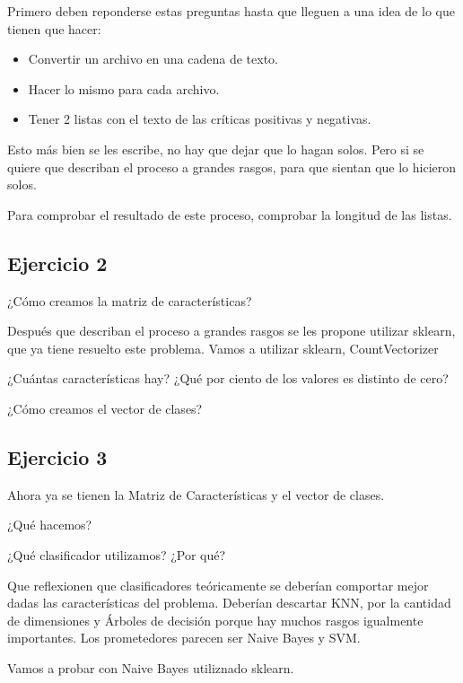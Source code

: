 \documentclass[a4paper,10pt]{article}
\begin{document}
    Primero deben reponderse estas preguntas hasta que lleguen a una
    idea de lo que tienen que hacer:
    \begin{itemize}
    	\item Convertir un archivo en una cadena de texto.
    	\item Hacer lo mismo para cada archivo.
    	\item Tener 2 listas con el texto de las críticas positivas y negativas.
    \end{itemize}
    
    Esto más bien se les escribe, no hay que dejar que lo hagan solos.
    Pero si se quiere que describan el proceso a grandes rasgos, para 
    que sientan que lo hicieron solos.
    
    Para comprobar el resultado de este proceso, comprobar la
    longitud de las listas.
    
   
  \subsection*{Ejercicio 2}
    
    ¿Cómo creamos la matriz de características?
    
    Después que describan el proceso a grandes rasgos se les propone utilizar 
    sklearn, que ya tiene resuelto este problema.
    Vamos a utilizar sklearn, CountVectorizer
    
    ¿Cuántas características hay?
    ¿Qué por ciento de los valores es distinto de cero?
    
    ¿Cómo creamos el vector de clases?
     
   \subsection*{Ejercicio 3}
    
    Ahora ya se tienen la Matriz de Características y el vector de clases.
    
    ¿Qué hacemos?
    
    ¿Qué clasificador utilizamos?
    ¿Por qué?
    
    Que reflexionen que clasificadores teóricamente se deberían 
    comportar mejor dadas las características del problema.
    Deberían descartar KNN, por la cantidad de dimensiones y 
    Árboles de decisión porque hay muchos rasgos igualmente importantes. 
    Los prometedores parecen ser Naive Bayes y SVM.
    
    Vamos a probar con Naive Bayes utiliznado sklearn.
    
\end{document}
